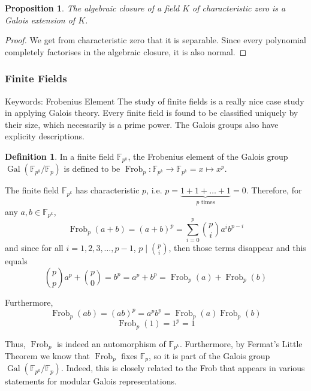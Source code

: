 \documentclass{article}
\newtheorem{prop}{Proposition}[section]
\theoremstyle{definition}
\newtheorem{definition}{Definition}[section]
\theoremstyle{definition}
\theoremstyle{definition}
\begin{document}
\begin{prop}\label{closuregal}
    The algebraic closure of a field $K$ of characteristic zero is a Galois extension of $K$.
\end{prop}
\begin{proof}
    We get from characteristic zero that it is separable. Since every polynomial completely factorises in the algebraic closure, it is also normal.
\end{proof}


\subsubsection{Finite Fields}
Keywords: Frobenius Element
\newline\newline
The study of finite fields is a really nice case study in applying Galois theory. Every finite field is found to be classified uniquely by their size, which necessarily is a prime power. The Galois groups also have explicity descriptions.

\begin{definition}
    In a finite field $\mathbb F_{p^k}$, the Frobenius element of the Galois group $\operatorname{Gal}(\mathbb F_{p^k}/\mathbb F_p)$ is defined to be $\operatorname{Frob}_p:\mathbb F_{p^k}\rightarrow\mathbb F_{p^k}=x\mapsto x^p$.
\end{definition}

The finite field $\mathbb F_{p^k}$ has characteristic $p$, i.e. $p=\underbrace{1+1+\dots+1}_{p\text{ times}}=0$. Therefore, for any $a,b\in\mathbb F_{p^k}$,
$$\operatorname{Frob}_p(a+b)=(a+b)^p=\sum_{i=0}^p\binom{p}{i}a^ib^{p-i}$$
and since for all $i=1,2,3,\dots,p-1$, $p\mid\binom{p}{i}$, then those terms disappear and this equals
$$\binom{p}{p}a^p+\binom{p}{0}=b^p=a^p+b^p=\operatorname{Frob}_p(a)+\operatorname{Frob}_p(b)$$

Furthermore,
$$\operatorname{Frob}_p(ab)=(ab)^p=a^pb^p=\operatorname{Frob}_p(a)\operatorname{Frob}_p(b)$$
$$\operatorname{Frob}_p(1)=1^p=1$$

Thus, $\operatorname{Frob}_p$ is indeed an automorphism of $\mathbb F_{p^k}$. Furthermore, by Fermat's Little Theorem we know that $\operatorname{Frob}_p$ fixes $\mathbb F_p$, so it is part of the Galois group $\operatorname{Gal}(\mathbb F_{p^k}/\mathbb F_p)$. Indeed, this is closely related to the Frob that appears in various statements for modular Galois representations.
\end{document}
